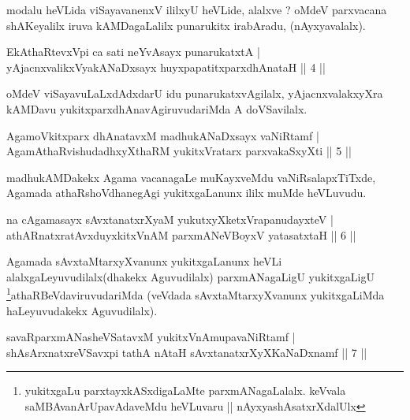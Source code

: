 \begin{artha}
modalu heVLida viSayavanenxV ililxyU heVLide, alalxve ? oMdeV parxvacana shAKeyalilx iruva kAMDagaLalilx punarukitx irabAradu, (nAyxyavalalx).
\end{artha}


\begin{shl}
EkAthaRtevxV\s pi ca sati neYvAsayx punarukatxtA |\\
yAjacnxvalikxVyakANaDxsayx huyxpapatitxparxdhAnataH \hfill || 4 ||
\end{shl}

\begin{artha}
oMdeV viSayavuLaLxdAdxdarU idu punarukatxvAgilalx, yAjacnxvalakxyXra kAMDavu yukitxparxdhAnavAgiruvudariMda A doVSavilalx.
\end{artha}

\begin{shl}
AgamoVkitxparx dhAnatavxM madhukANaDxsayx vaNiRtamf |\\
AgamAthaRvishudadhxyXthaRM yukitxVratarx parxvakaSxyXti \hfill || 5 ||
\end{shl}

\begin{artha}
madhukAMDakekx Agama vacanagaLe muKayxveMdu vaNiRsalapxTiTxde, Agamada athaRshoVdhanegAgi yukitxgaLanunx ililx muMde heVLuvudu.
\end{artha}


\begin{shl}
na cA\s \s gamasayx sAvxtanatxrXyaM yukutxyXketxVrapanudayxteV |\\
athARnatxratAvxduyxkitxVnAM parxmANeVBoyxV yatasatxtaH \hfill || 6 ||
\end{shl}

\begin{artha}
Agamada sAvxtaMtarxyXvanunx yukitxgaLanunx heVLi alalxgaLeyuvudilalx(dhakekx Aguvudilalx) parxmANagaLigU yukitxgaLigU \footnote[1]{yukitxgaLu parxtayxkASxdigaLaMte parxmANagaLalalx. keVvala saMBAvanArUpavAdaveMdu heVLuvaru || nAyxyashAsatxrXdalUlx}athaRBeVdaviruvudariMda (veVdada sAvxtaMtarxyXvanunx yukitxgaLiMda haLeyuvudakekx Aguvudilalx).
\end{artha}


\begin{shl}
savaRparxmANasheVSatavxM yukitxVnAmupavaNiRtamf |\\
shAsArxnatxreVSavxpi tathA nAtaH sAvxtanatxrXyXKaNaDxnamf \hfill || 7 ||
\end{shl}

